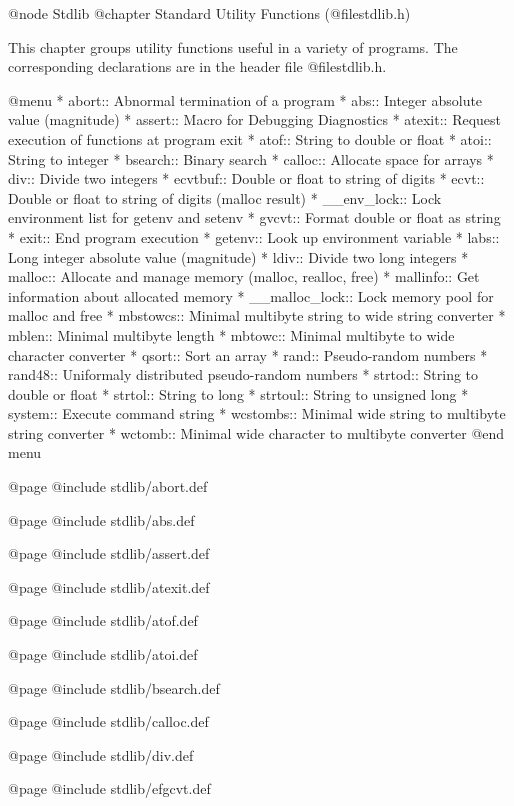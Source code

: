 @node Stdlib
@chapter Standard Utility Functions (@file{stdlib.h})

This chapter groups utility functions useful in a variety of programs.
The corresponding declarations are in the header file @file{stdlib.h}.

@menu 
* abort::       Abnormal termination of a program
* abs::         Integer absolute value (magnitude)
* assert::      Macro for Debugging Diagnostics
* atexit::      Request execution of functions at program exit
* atof::        String to double or float
* atoi::        String to integer
* bsearch::     Binary search
* calloc::      Allocate space for arrays
* div::         Divide two integers
* ecvtbuf::     Double or float to string of digits
* ecvt::        Double or float to string of digits (malloc result)
* __env_lock::		Lock environment list for getenv and setenv
* gvcvt::       Format double or float as string
* exit::        End program execution
* getenv::      Look up environment variable
* labs::        Long integer absolute value (magnitude)
* ldiv::        Divide two long integers
* malloc::      Allocate and manage memory (malloc, realloc, free)
* mallinfo::	Get information about allocated memory
* __malloc_lock::	Lock memory pool for malloc and free
* mbstowcs::	Minimal multibyte string to wide string converter
* mblen::	Minimal multibyte length
* mbtowc::      Minimal multibyte to wide character converter
* qsort::       Sort an array
* rand::        Pseudo-random numbers
* rand48::      Uniformaly distributed pseudo-random numbers
* strtod::      String to double or float
* strtol::      String to long
* strtoul::     String to unsigned long
* system::      Execute command string
* wcstombs::	Minimal wide string to multibyte string converter
* wctomb::      Minimal wide character to multibyte converter
@end menu

@page
@include stdlib/abort.def

@page
@include stdlib/abs.def

@page
@include stdlib/assert.def

@page
@include stdlib/atexit.def

@page
@include stdlib/atof.def

@page
@include stdlib/atoi.def

@page
@include stdlib/bsearch.def

@page
@include stdlib/calloc.def

@page
@include stdlib/div.def

@page
@include stdlib/efgcvt.def

